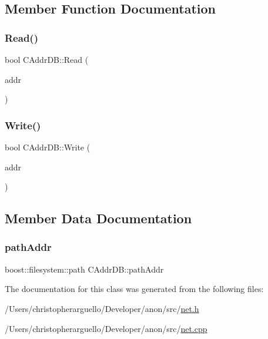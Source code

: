 \subsection{Member Function Documentation}
\mbox{\label{class_c_addr_d_b_aed4b567fb7c2dd15b2856e7c769967b7}} 
\subsubsection{\texorpdfstring{Read()}{Read()}}
{\footnotesize\ttfamily bool C\+Addr\+D\+B\+::\+Read (\begin{DoxyParamCaption}\item[{\mbox{\hyperlink{class_c_addr_man}{C\+Addr\+Man}} \&}]{addr }\end{DoxyParamCaption})}

\mbox{\label{class_c_addr_d_b_aaec90dba59cd69a2f25bc5630a1dde39}} 
\subsubsection{\texorpdfstring{Write()}{Write()}}
{\footnotesize\ttfamily bool C\+Addr\+D\+B\+::\+Write (\begin{DoxyParamCaption}\item[{const \mbox{\hyperlink{class_c_addr_man}{C\+Addr\+Man}} \&}]{addr }\end{DoxyParamCaption})}



\subsection{Member Data Documentation}
\mbox{\label{class_c_addr_d_b_afeba63488deb50f5aac678a890d41a0d}} 
\subsubsection{\texorpdfstring{path\+Addr}{pathAddr}}
{\footnotesize\ttfamily boost\+::filesystem\+::path C\+Addr\+D\+B\+::path\+Addr\hspace{0.3cm}{\ttfamily [private]}}



The documentation for this class was generated from the following files\+:\begin{DoxyCompactItemize}
\item 
/\+Users/christopherarguello/\+Developer/anon/src/\mbox{\hyperlink{net_8h}{net.\+h}}\item 
/\+Users/christopherarguello/\+Developer/anon/src/\mbox{\hyperlink{net_8cpp}{net.\+cpp}}\end{DoxyCompactItemize}
